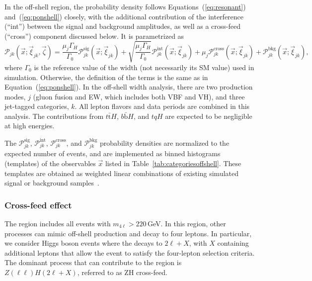 In the off-shell region, the probability density follows Equations~(\ref{eq:resonant}) and~(\ref{eq:ponshell}) closely,
with the additional contribution of the interference (``int'') between the signal and background amplitudes,
as well as a cross-feed (``cross'') component discussed below. It is parametrized as 
\begin{equation}\label{eq:poffshell}
    \mathcal{P}_{jk}(\vec{x};\vec{\xi}_{jk},\vec\zeta) =
    \frac{\mu_j \Gamma_H}{\Gamma_0}\mathcal{P}_{jk}^\text{sig} ( \vec{x};\vec{\xi}_{jk})
    + \sqrt{\frac{\mu_j \Gamma_H}{\Gamma_0}}\mathcal{P}_{jk}^\mathrm{int} ( \vec{x};\vec{\xi}_{jk})
    + \mu_j\mathcal{P}_{jk}^\text{cross} (\vec{x};\vec{\xi}_{jk})
    + \mathcal{P}_{jk}^\text{bkg} ( \vec{x};\vec{\xi}_{jk}),
\end{equation}
where $\Gamma_0$ is the reference value of the \Hboson width (not necessarily its SM value)
used in simulation. Otherwise, the definition of the terms is the same as in Equation~(\ref{eq:ponshell}). 
In the off-shell width analysis, there are two production modes, $j$ (gluon fusion and EW, which includes both VBF and VH), 
and three jet-tagged categories, $k$. All lepton flavors and data periods are combined in this analysis.
The contributions from $t\bar{\text{t}}H$, $b\bar{\text{b}}H$, and $tqH$ are expected to be negligible at high energies.

The $\mathcal{P}_{jk}^{\text{sig}}$, $\mathcal{P}_{jk}^{\text{int}}$, $\mathcal{P}_{jk}^{\text{cross}}$, and $\mathcal{P}_{jk}^\text{bkg}$ probability densities are normalized to the expected number of events, and are implemented as binned histograms (templates) of the observables $\vec{x}$ listed in Table~\ref{tab:categoriesoffshell}. These templates are obtained as weighted linear combinations of existing simulated signal or background samples~\cite{PhysRevD.111.092014}.

\subsubsection{Cross-feed effect}

The \offshell region includes all events with $m_{4\ell} > 220$\,GeV. In this region, other processes can mimic off-shell \Hboson production and decay to four leptons. In particular, we consider \onshell Higgs boson events where the \Hboson decays to $2\ell + X$, with $X$ containing additional leptons that allow the event to satisfy the four-lepton selection criteria. The dominant \onshell \Hboson process that can contribute to the \offshell region is $Z(\ell\ell)H(2\ell + X)$, referred to as ZH cross-feed.

